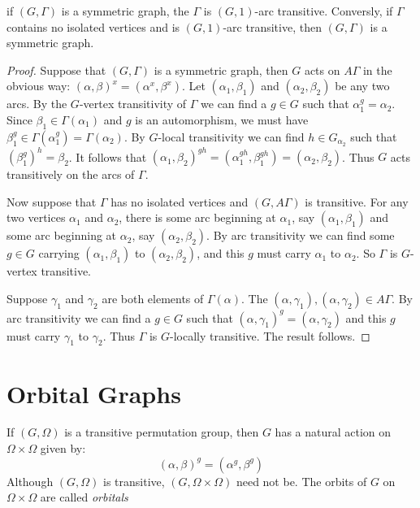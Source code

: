 \begin{proposition}
if $(G, \Gamma)$ is a symmetric graph, the $\Gamma$ is $(G,1)$-arc transitive.
Conversly, if $\Gamma$ contains no isolated vertices and is $(G,1)$-arc transitive,
then $(G, \Gamma)$ is a symmetric graph.

\begin{proof}
Suppose that $(G, \Gamma)$ is a symmetric graph, then
$G$ acts on $A \Gamma$ in the obvious way:
$(\alpha,\beta)^x = (\alpha^x, \beta^x)$.
Let $(\alpha_1, \beta_1)$ and $(\alpha_2, \beta_2)$
be any two arcs.
By the $G$-vertex transitivity of $\Gamma$ we can find a $g \in G$ such that
$\alpha_1^g = \alpha_2$.
Since $\beta_1 \in \Gamma(\alpha_1)$ and $g$ is an automorphism,
we must have $\beta_1^g \in \Gamma(\alpha_1^g) = \Gamma(\alpha_2)$.
By $G$-local transitivity we can find $h \in G_{\alpha_2}$
such that $(\beta_1^g)^h = \beta_2$.
It follows that
$(\alpha_1, \beta_2)^{gh} = (\alpha_1^{gh}, \beta_1^{gh})
= (\alpha_2, \beta_2)$.
Thus $G$ acts transitively on the arcs of $\Gamma$.

Now suppose that $\Gamma$ has no isolated vertices and $(G,A \Gamma)$
is transitive. For any two vertices $\alpha_1$ and $\alpha_2$,
there is some arc beginning at $\alpha_1$, say $(\alpha_1,\beta_1)$
and some arc beginning at $\alpha_2$, say $(\alpha_2, \beta_2)$.
By arc transitivity we can find some $g \in G$ carrying
$(\alpha_1, \beta_1)$ to $(\alpha_2, \beta_2)$,
and this $g$ must carry $\alpha_1$ to $\alpha_2$.
So $\Gamma$ is $G$-vertex transitive.

Suppose $\gamma_1$ and $\gamma_2$ are both elements of $\Gamma(\alpha)$.
The $(\alpha,\gamma_1), (\alpha,\gamma_2) \in A \Gamma$.
By arc transitivity we can find a $g \in G$ such that
$(\alpha, \gamma_1)^g = (\alpha, \gamma_2)$
and this $g$ must carry $\gamma_1$ to $\gamma_2$.
Thus $\Gamma$ is $G$-locally transitive.
The result follows.
\end{proof}
\end{proposition}

\section{Orbital Graphs}

If $(G,\Omega)$ is a transitive permutation group,
then $G$ has a natural action on $\Omega \times \Omega$
given by:
$$ (\alpha,\beta)^g = (\alpha^g, \beta^g) $$
Although $(G,\Omega)$ is transitive, $(G,\Omega \times \Omega)$
need not be. 
The orbits of $G$ on $\Omega \times \Omega$ are called {\it orbitals}

